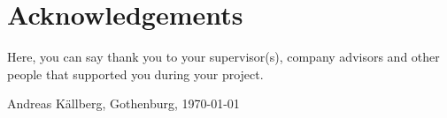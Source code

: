 \thispagestyle{plain}			%
\section*{Acknowledgements}
Here, you can say thank you to your supervisor(s), company advisors and other people that supported you during your project.


\vspace{1.5cm}
\hfill
Andreas Källberg, Gothenburg, \today

\newpage				%
\thispagestyle{empty}
\mbox{}
